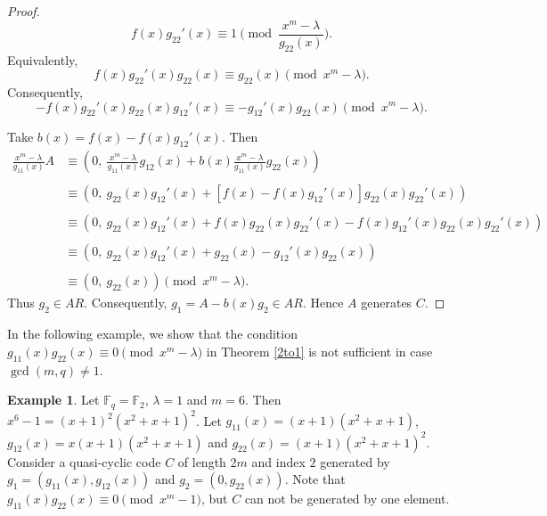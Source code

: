 \documentclass[12 pt]{extarticle}
\numberwithin{equation}{section}
\theoremstyle{definition}
\newtheorem{example}{Example}[section]
\begin{document}
\begin{proof}
         $$f(x)g_{22}'(x)\equiv 1  \pmod{\frac{x^m-\lambda}{g_{22}(x)}}.$$
   Equivalently, $$f(x)g_{22}'(x)g_{22}(x)\equiv g_{22}(x) \pmod{x^m-\lambda}.$$
         Consequently,  
      $$-f(x)g_{22}'(x)g_{22}(x)g_{12}'(x)\equiv -g_{12}'(x)g_{22}(x) \pmod{x^m-\lambda}.$$
     
 Take $b(x)=f(x)-f(x)g_{12}'(x)$. Then
 \begin{equation*}
     \begin{split}
         \frac{x^m-\lambda}{g_{11}(x)}A&\equiv \left (0,\ \frac{x^m-\lambda}{g_{11}(x)}g_{12}(x)+b(x)\frac{x^m-\lambda}{g_{11}(x)}g_{22}(x)\right )\\
         \\
         &\equiv (0,\ g_{22}(x)g_{12}'(x)+[f(x)-f(x)g_{12}'(x)]g_{22}(x)g_{22}'(x))\\
         \\
         &\equiv (0,\ g_{22}(x)g_{12}'(x)+f(x)g_{22}(x)g_{22}'(x)-f(x)g_{12}'(x)g_{22}(x)g_{22}'(x))\\
         \\
         &\equiv (0,\  g_{22}(x)g_{12}'(x)+g_{22}(x)-g_{12}'(x)g_{22}(x))\\
         \\
         &\equiv (0,\ g_{22}(x)) \pmod{x^m-\lambda}.
     \end{split}
 \end{equation*}
 Thus $g_2\in AR$. Consequently, $g_1=A-b(x)g_2\in AR$. Hence $A$ generates $C$.
 \end{proof}
In the following example, we show that the condition $g_{11}(x)g_{22}(x)\equiv 0\pmod{x^m-\lambda}$ in Theorem \ref{2to1} is not sufficient in case $\gcd(m,q)\ne 1$.

\begin{example}
 Let $\mathbb{F}_q=\mathbb{F}_2$, $\lambda=1$ and $m=6$. Then $x^6-1=(x+1)^2(x^2+x+1)^2$. Let $g_{11}(x)=(x+1)(x^2+x+1)$, $g_{12}(x)=x(x+1)(x^2+x+1)$ and $g_{22}(x)=(x+1)(x^2+x+1)^2$. Consider a quasi-cyclic code $C$ of length $2m$ and index $2$ generated by $g_1=(g_{11}(x),g_{12}(x))$ and $g_2=(0,g_{22}(x))$. Note that $g_{11}(x)g_{22}(x)\equiv 0\pmod{x^m-1}$, but  $C$ can not be generated by one element.   
\end{example}
\end{document}
